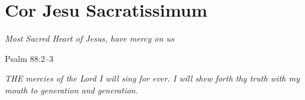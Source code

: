 \documentclass{article}
\begin{document}
\section*{Cor Jesu Sacratissimum}



\textit{Most Sacred Heart of Jesus, have mercy on us}

Psalm 88:2--3


\textit{THE mercies of the Lord I will sing for ever. I will shew forth thy truth with my mouth to generation and generation.}


\end{document}
